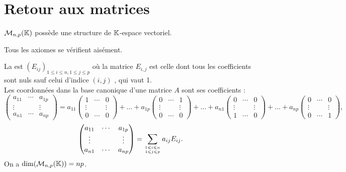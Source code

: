 \documentclass{book}
\begin{document}
\section{Retour aux matrices}
\begin{Proposition}
$\mathcal{M}_{n,p}(\mathbb{K})$ possède une structure de $\mathbb{K} $-espace vectoriel. 
\end{Proposition}
\begin{Demonstration}
Tous les axiomes se vérifient aisément.  
\end{Demonstration}
\begin{DefinitionProposition}La  est $(E_{ij})_{1\leqslant i\leqslant n, 1\leqslant j\leqslant p}$ où la matrice  $E_{i,j}$ est celle dont tous les coefficients sont nuls sauf celui d'indice $(i,j)$ , qui vaut 1.\\
 Les coordonnées dans la base canonique d'une matrice $A$ sont ses coefficients :
 $$ \begin{pmatrix}
a_{11} & \cdots & a_{1p}\\
 \vdots &  & \vdots\\
a_{n1} & \cdots & a_{np}
\end{pmatrix} =a_{11}\begin{pmatrix}
1 & \cdots & 0\\
 \vdots &  & \vdots\\
0 & \cdots & 0
\end{pmatrix}+\dots+a_{1p}\begin{pmatrix}
0 & \cdots & 1\\
 \vdots &  & \vdots\\
0 & \cdots & 0
\end{pmatrix}+ \dots+a_{n1}\begin{pmatrix}
0 & \cdots & 0\\
 \vdots &  & \vdots\\
1 & \cdots & 0
\end{pmatrix}+\dots+a_{np} \begin{pmatrix}
0 & \cdots & 0\\
 \vdots &  & \vdots\\
0 & \cdots & 1
\end{pmatrix},$$
 $$ \begin{pmatrix}
a_{11} & \cdots & a_{1p}\\
 \vdots &  & \vdots\\
a_{n1} & \cdots & a_{np}
\end{pmatrix} =  \sum _{1\leqslant i\leqslant n\atop 1\leqslant j\leqslant p}  a_{ij} E_{ij}.$$
On a $\dim( \mathcal{M}_{n,p}(\mathbb{K}))=np$.
\end{DefinitionProposition}
\end{document}

